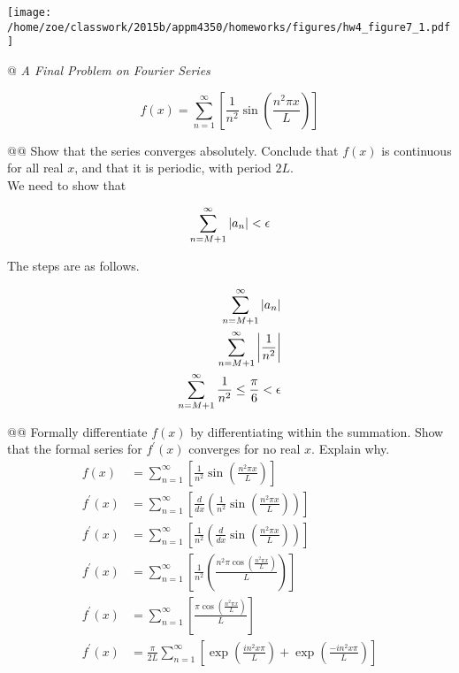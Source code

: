 \documentclass[10pt]{article}
\begin{document}
\begin{easylist}[enumerate]
\simpleweave

\texttt{[image: /home/zoe/classwork/2015b/appm4350/homeworks/figures/hw4\_figure7\_1.pdf]}

\nosimpleweave

    \newpage
    @ \textit{A Final Problem on Fourier Series}

    \[
        f(x) = \sum_{n=1}^\infty \left[ \frac{1}{n^2} \sin\left(\frac{n^2 \pi x}{L}\right) \right]
    \]

    @@ Show that the series converges absolutely. Conclude that $f(x)$ is continuous for all real $x$, and that it is
    periodic, with period $2L$.\\

    We need to show that

    \[
        \sum_{n=M+1}^\infty \left\lvert a_n \right\rvert < \epsilon
    \]

    The steps are as follows.

    \begin{align*}
        \sum_{n=M+1}^\infty \left\lvert a_n \right\rvert\\
        \sum_{n=M+1}^\infty \left\lvert \frac{1}{n^2} \right\rvert\\
        \sum_{n=M+1}^\infty \frac{1}{n^2} \le \frac{\pi}{6} < \epsilon\\
    \end{align*}

    @@ Formally differentiate $f(x)$ by differentiating within the summation. Show that the formal series for
    $f^\prime(x)$ converges for no real $x$. Explain why.\\

    \begin{align*}
        f(x) &= \sum_{n=1}^\infty \left[ \frac{1}{n^2} \sin\left(\frac{n^2 \pi x}{L}\right) \right]\\
        f^\prime(x) &= \sum_{n=1}^\infty \left[ \frac{d}{dx} \left( \frac{1}{n^2} \sin\left(\frac{n^2 \pi x}{L}\right)\right) \right]\\
        f^\prime(x) &= \sum_{n=1}^\infty \left[ \frac{1}{n^2} \left( \frac{d}{dx} \sin\left(\frac{n^2 \pi x}{L}\right)\right) \right]\\
        f^\prime(x) &= \sum_{n=1}^\infty \left[ \frac{1}{n^2} \left( \frac{n^2 \pi \cos\left(\frac{n^2 \pi x}{L}\right)}{L} \right) \right]\\
        f^\prime(x) &= \sum_{n=1}^\infty \left[ \frac{\pi \cos\left(\frac{n^2 \pi x}{L}\right)}{L} \right]\\
        f^\prime(x) &= \frac{\pi}{2L} \sum_{n=1}^\infty \left[ \exp\left(\frac{in^2x\pi}{L}\right) + \exp\left(\frac{-in^2x\pi}{L}\right) \right]\\
    \end{align*}


\end{easylist}
\end{document}
